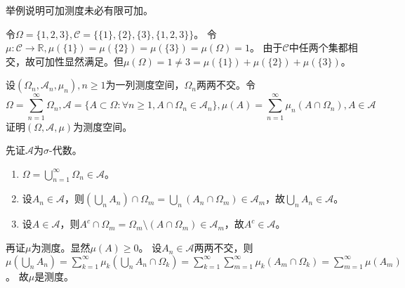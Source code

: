 \documentclass{ctexart}
\begin{document}
\begin{problem}\label{pro:1.4.9}
  举例说明可加测度未必有限可加。
\end{problem}
\begin{solution}
  令\(\Omega=\{1,2,3\},\mathcal{C}=\{\{1\},\{2\},\{3\},\{1,2,3\}\} \)。
  令\(\mu:\mathcal{C} \to \mathbb{R},\mu(\{1\})=\mu(\{2\})=\mu(\{3\})=\mu(\Omega)=1 \)。
  由于\(\mathcal{C} \)中任两个集都相交，故可加性显然满足。但\(\mu(\Omega)=1 \neq 3 = \mu(\{1\})+\mu(\{2\})+\mu(\{3\}) \)。
\end{solution}

\begin{problem}
  设\((\Omega_n,\mathcal{A}_n,\mu_{n}),n \geq 1 \)为一列测度空间，\(\Omega_n \)两两不交。令 \[
    \Omega=\sum_{n=1}^{\infty} \Omega_n, \mathcal{A}=\{A \subset \Omega : \forall n \geq 1,A \cap \Omega_n \in \mathcal{A}_n\}, \mu (A)=\sum_{n=1}^{\infty} \mu_{n} (A \cap \Omega_n), A \in \mathcal{A}
  \]
  证明\((\Omega , \mathcal{A} , \mu ) \)为测度空间。
\end{problem}
\begin{solution}
  先证\(\mathcal{A} \)为\(\sigma \)-代数。
  \begin{enumerate}
    \item \(\Omega = \bigcup_{n=1}^{\infty}\Omega_n \in \mathcal{A} \)。
    \item 设\(A_n \in \mathcal{A} \)，则\(( \bigcup_{n}A_n ) \cap \Omega_m = \bigcup_{n}(A_n \cap \Omega_m) \in \mathcal{A}_m\)，故\(\bigcup_{n}A_n \in \mathcal{A} \)。
    \item 设\(A \in \mathcal{A} \)，则\(A^c \cap \Omega_m = \Omega_m \setminus (A \cap \Omega_m) \in \mathcal{A}_m \)，故\(A^c \in \mathcal{A} \)。
  \end{enumerate}
  再证\(\mu \)为测度。显然\(\mu(A) \geq 0 \)。
  设\(A_n \in \mathcal{A} \)两两不交，则
  \(\mu(\bigcup_{n}A_n) = \sum_{k=1}^{\infty}\mu_k(\bigcup_{n}A_n \cap \Omega_k) = \sum_{k=1}^{\infty}\sum_{m=1}^{\infty}\mu_k(A_m \cap \Omega_k) = \sum_{m=1}^{\infty}\mu(A_m) \)。
  故\(\mu \)是测度。
\end{solution}
\end{document}
